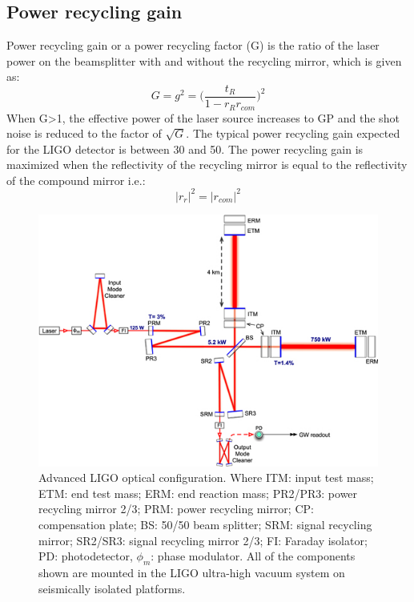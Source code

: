 \documentclass[conference]{IEEEtran}
\begin{document}
\subsection{Power recycling gain}

Power recycling gain or a power recycling factor (G) is the ratio of the laser power on the beamsplitter with and without the recycling mirror, which is given as:
\begin{equation}
G=g^2=\bigg( \frac{t_{R}}{1-r_{R}r_{com}}\bigg)^2
\end{equation}
When G>1, the effective power of the laser source increases to GP and the shot noise is reduced to the factor of $\sqrt{G}$. The typical power recycling gain expected for the LIGO detector is between 30 and 50. The power recycling gain is maximized when the reflectivity of the recycling mirror is equal to the reflectivity of the compound mirror i.e.\cite{Izumi:203yfa}:
\begin{equation}
|r_{r}|^2=|r_{com}|^2
\end{equation}

\begin{figure}[htbp]
\centerline{\includegraphics[scale=0.48]{cqg507871f1_online.jpg}}
\caption{Advanced LIGO optical configuration.  Where ITM: input test mass; ETM: end test mass; ERM: end reaction mass; PR2/PR3: power recycling mirror 2/3; PRM: power recycling mirror;  CP: compensation plate; BS: 50/50 beam splitter; SRM: signal recycling mirror; SR2/SR3: signal recycling mirror 2/3; FI: Faraday isolator;  PD: photodetector, $\phi_m$: phase modulator. All of the components shown are mounted in the LIGO ultra-high vacuum system on seismically isolated platforms\cite{2015}.}


\end{figure}
\end{document}
